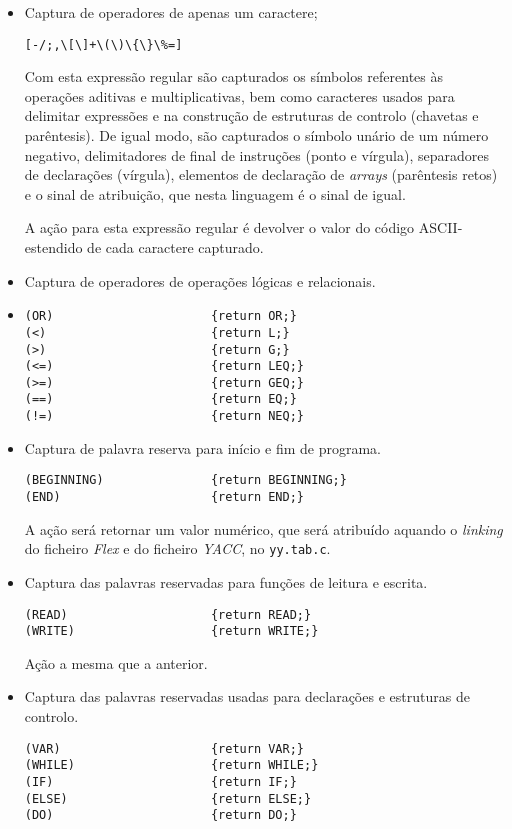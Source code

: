 \begin{itemize}
	\item Captura de operadores de apenas um caractere; 
\begin{verbatim}
[-/;,\[\]+\(\)\{\}\%=]  
\end{verbatim}

Com esta expressão regular são capturados os símbolos referentes às operações
aditivas e multiplicativas, bem como caracteres usados para delimitar expressões
e na construção de estruturas de controlo (chavetas e parêntesis). De igual
modo, são capturados o símbolo unário de um número negativo, delimitadores de
final de instruções (ponto e vírgula), separadores de declarações (vírgula),
elementos de declaração de \emph{arrays} (parêntesis retos) e o sinal de
atribuição, que nesta linguagem é o sinal de igual. 

A ação para esta expressão regular é devolver o valor do código ASCII-estendido
de cada caractere capturado.


	\item Captura de operadores de operações lógicas e relacionais.
	\item 
\begin{verbatim}
(OR)                      {return OR;}
(<)                       {return L;}
(>)                       {return G;}
(<=)                      {return LEQ;}
(>=)                      {return GEQ;}
(==)                      {return EQ;}
(!=)                      {return NEQ;}
\end{verbatim}
	\item Captura de palavra reserva para início e fim de programa. 
\begin{verbatim}
(BEGINNING)               {return BEGINNING;}
(END)                     {return END;}
\end{verbatim}

A ação será retornar um valor numérico, que será atribuído aquando
o \emph{linking} do ficheiro \emph{Flex} e do ficheiro \emph{YACC}, no
\texttt{yy.tab.c}.    

	\item Captura das palavras reservadas para funções de leitura e escrita. 
\begin{verbatim}
(READ)                    {return READ;}
(WRITE)                   {return WRITE;}
\end{verbatim}

Ação a mesma que a anterior.

	\item Captura das palavras reservadas usadas para declarações e estruturas de
		controlo.
\begin{verbatim}
(VAR)                     {return VAR;}
(WHILE)                   {return WHILE;}
(IF)                      {return IF;}
(ELSE)                    {return ELSE;}
(DO)                      {return DO;}
\end{verbatim}


\end{itemize}
